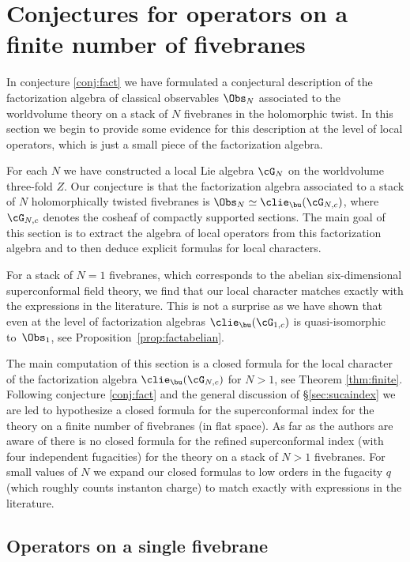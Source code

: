 \section{Conjectures for operators on a finite number of fivebranes}

In conjecture \ref{conj:fact} we have formulated a conjectural description of the factorization algebra of classical observables $\Obs_{N}$ associated to the worldvolume theory on a stack of $N$ fivebranes in the holomorphic twist.
In this section we begin to provide some evidence for this description at the level of local operators, which is just a small piece of the factorization algebra.

For each $N$ we have constructed a local Lie algebra $\cG_N$ on the worldvolume three-fold $Z$. 
Our conjecture is that the factorization algebra associated to a stack of $N$ holomorphically twisted fivebranes is $\Obs_N \simeq \clie_\bu(\cG_{N,c})$, where $\cG_{N,c}$ denotes the cosheaf of compactly supported sections. 
The main goal of this section is to extract the algebra of local operators from this factorization algebra and to then deduce explicit formulas for local characters.

For a stack of $N=1$ fivebranes, which corresponds to the abelian six-dimensional superconformal field theory, we find that our local character matches exactly with the expressions in the literature. 
This is not a surprise as we have shown that even at the level of factorization algebras $\clie_\bu(\cG_{1,c})$ is quasi-isomorphic to~$\Obs_1$, see Proposition~\ref{prop:factabelian}.

The main computation of this section is a closed formula for the local character of the factorization algebra $\clie_\bu(\cG_{N,c})$ for $N > 1$, see Theorem \ref{thm:finite}. 
Following conjecture \ref{conj:fact} and the general discussion of \S \ref{sec:sucaindex} we are led to hypothesize a closed formula for the superconformal index for the theory on a finite number of fivebranes (in flat space).
As far as the authors are aware of there is no closed formula for the refined superconformal index (with four independent fugacities) for the theory on a stack of $N > 1$ fivebranes.
For small values of $N$ we expand our closed formulas to low orders in the fugacity $q$ (which roughly counts instanton charge) to match exactly with expressions in the literature. 

\subsection{Operators on a single fivebrane}


